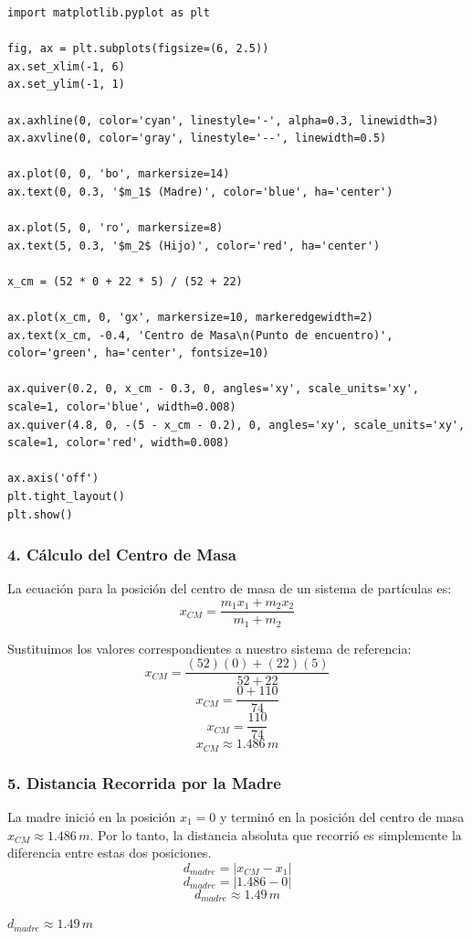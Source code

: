 \documentclass[12pt, a4paper]{article}
\begin{document}
\begin{lstlisting}
import matplotlib.pyplot as plt

fig, ax = plt.subplots(figsize=(6, 2.5))
ax.set_xlim(-1, 6)
ax.set_ylim(-1, 1)

ax.axhline(0, color='cyan', linestyle='-', alpha=0.3, linewidth=3)
ax.axvline(0, color='gray', linestyle='--', linewidth=0.5)

ax.plot(0, 0, 'bo', markersize=14)
ax.text(0, 0.3, '$m_1$ (Madre)', color='blue', ha='center')

ax.plot(5, 0, 'ro', markersize=8)
ax.text(5, 0.3, '$m_2$ (Hijo)', color='red', ha='center')

x_cm = (52 * 0 + 22 * 5) / (52 + 22)

ax.plot(x_cm, 0, 'gx', markersize=10, markeredgewidth=2)
ax.text(x_cm, -0.4, 'Centro de Masa\n(Punto de encuentro)', color='green', ha='center', fontsize=10)

ax.quiver(0.2, 0, x_cm - 0.3, 0, angles='xy', scale_units='xy', scale=1, color='blue', width=0.008)
ax.quiver(4.8, 0, -(5 - x_cm - 0.2), 0, angles='xy', scale_units='xy', scale=1, color='red', width=0.008)

ax.axis('off')
plt.tight_layout()
plt.show()
\end{lstlisting}

\subsubsection*{4. Cálculo del Centro de Masa}
La ecuación para la posición del centro de masa de un sistema de partículas es:
\[ x_{CM} = \frac{m_1 x_1 + m_2 x_2}{m_1 + m_2} \]

Sustituimos los valores correspondientes a nuestro sistema de referencia:
\[ x_{CM} = \frac{(52)(0) + (22)(5)}{52 + 22} \]
\[ x_{CM} = \frac{0 + 110}{74} \]
\[ x_{CM} = \frac{110}{74} \]
\[ x_{CM} \approx 1.486 \, \si{m} \]

\subsubsection*{5. Distancia Recorrida por la Madre}
La madre inició en la posición $x_1 = 0$ y terminó en la posición del centro de masa $x_{CM} \approx 1.486 \, \si{m}$. Por lo tanto, la distancia absoluta que recorrió es simplemente la diferencia entre estas dos posiciones.
\[ d_{madre} = |x_{CM} - x_1| \]
\[ d_{madre} = |1.486 - 0| \]
\[ d_{madre} \approx 1.49 \, \si{m} \]

\begin{tcolorbox}[colback=green!5!white, colframe=green!50!black, title=Respuesta Final]
\centering \Large $d_{madre} \approx 1.49 \, \si{m}$
\end{tcolorbox}
\end{document}
